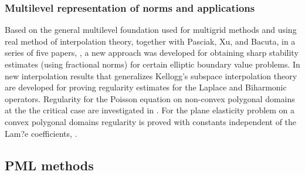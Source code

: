 \documentclass[CJK,11pt]{amsart}
\theoremstyle{definition}
\begin{document}
\begin{CJK*}{UTF8}{gbsn}
\subsubsection{Multilevel representation of norms and applications}
Based on the general multilevel foundation used for multigrid methods
and using real method of interpolation theory, together with Pasciak,
Xu, and Bacuta, in a series of five papers,
\cite{bacuta2002shift, bacuta2003using, bacuta2003regularity-c, bacuta2003regularity-a, bacuta2003regularity-b}, a
new approach was developed for obtaining sharp stability estimates
(using fractional norms) for certain elliptic boundary value
problems. In \cite{bacuta2002shift, bacuta2003using}
new interpolation results that generalizes Kellogg's subspace
interpolation theory are developed for proving regularity estimates
for the Laplace and Biharmonic operators. Regularity for the Poisson
equation on non-convex polygonal domains at the the critical case are
investigated in \cite{bacuta2003regularity-c, bacuta2003regularity-a}.
For the plane elasticity problem on a convex polygonal domains
regularity is proved with constants independent of the Lam?e
coefficients, \cite{bacuta2003regularity-b}.

\subsection{PML methods}



\end{CJK*}
\end{document}
